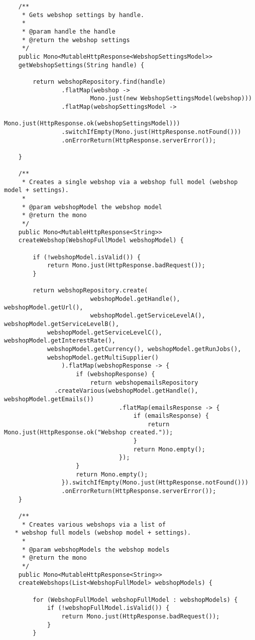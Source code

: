 \begin{verbatim}
	/**
	 * Gets webshop settings by handle.
	 *
	 * @param handle the handle
	 * @return the webshop settings
	 */
	public Mono<MutableHttpResponse<WebshopSettingsModel>>
    getWebshopSettings(String handle) {

		return webshopRepository.find(handle)
				.flatMap(webshop ->
						Mono.just(new WebshopSettingsModel(webshop)))
				.flatMap(webshopSettingsModel ->
						Mono.just(HttpResponse.ok(webshopSettingsModel)))
				.switchIfEmpty(Mono.just(HttpResponse.notFound()))
				.onErrorReturn(HttpResponse.serverError());

	}

	/**
	 * Creates a single webshop via a webshop full model (webshop model + settings).
	 *
	 * @param webshopModel the webshop model
	 * @return the mono
	 */
	public Mono<MutableHttpResponse<String>>
    createWebshop(WebshopFullModel webshopModel) {

		if (!webshopModel.isValid()) {
			return Mono.just(HttpResponse.badRequest());
		}

		return webshopRepository.create(
						webshopModel.getHandle(), webshopModel.getUrl(),
						webshopModel.getServiceLevelA(), webshopModel.getServiceLevelB(),
            webshopModel.getServiceLevelC(), webshopModel.getInterestRate(),
            webshopModel.getCurrency(), webshopModel.getRunJobs(),
            webshopModel.getMultiSupplier()
				).flatMap(webshopResponse -> {
					if (webshopResponse) {
						return webshopemailsRepository
              .createVarious(webshopModel.getHandle(), webshopModel.getEmails())
								.flatMap(emailsResponse -> {
									if (emailsResponse) {
										return Mono.just(HttpResponse.ok("Webshop created."));
									}
									return Mono.empty();
								});
					}
					return Mono.empty();
				}).switchIfEmpty(Mono.just(HttpResponse.notFound()))
				.onErrorReturn(HttpResponse.serverError());
	}

	/**
	 * Creates various webshops via a list of
   * webshop full models (webshop model + settings).
	 *
	 * @param webshopModels the webshop models
	 * @return the mono
	 */
	public Mono<MutableHttpResponse<String>>
    createWebshops(List<WebshopFullModel> webshopModels) {

		for (WebshopFullModel webshopFullModel : webshopModels) {
			if (!webshopFullModel.isValid()) {
				return Mono.just(HttpResponse.badRequest());
			}
		}


\end{verbatim}
